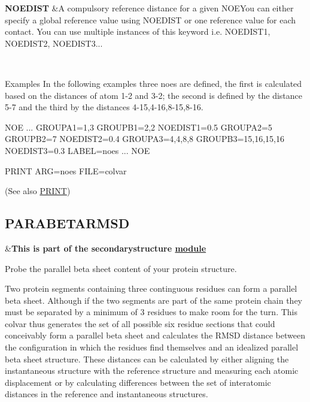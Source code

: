 \begin{TabularC}{2}
\hline
{\bfseries  N\+O\+E\+D\+I\+S\+T } &A compulsory reference distance for a given N\+O\+E\+You can either specify a global reference value using N\+O\+E\+D\+I\+S\+T or one reference value for each contact. You can use multiple instances of this keyword i.\+e. N\+O\+E\+D\+I\+S\+T1, N\+O\+E\+D\+I\+S\+T2, N\+O\+E\+D\+I\+S\+T3...  

\\
\end{TabularC}


\begin{DoxyParagraph}{Examples}
In the following examples three noes are defined, the first is calculated based on the distances of atom 1-\/2 and 3-\/2; the second is defined by the distance 5-\/7 and the third by the distances 4-\/15,4-\/16,8-\/15,8-\/16.
\end{DoxyParagraph}
\begin{DoxyVerb}NOE ...
GROUPA1=1,3 GROUPB1=2,2 NOEDIST1=0.5
GROUPA2=5 GROUPB2=7 NOEDIST2=0.4
GROUPA3=4,4,8,8 GROUPB3=15,16,15,16 NOEDIST3=0.3
LABEL=noes
... NOE

PRINT ARG=noes FILE=colvar
\end{DoxyVerb}
 (See also \hyperlink{PRINT}{P\+R\+I\+N\+T}) \hypertarget{PARABETARMSD}{}\subsection{P\+A\+R\+A\+B\+E\+T\+A\+R\+M\+S\+D}\label{PARABETARMSD}
\begin{TabularC}{2}
\hline
&{\bfseries  This is part of the secondarystructure \hyperlink{mymodules}{module }}   \\
\end{TabularC}
Probe the parallel beta sheet content of your protein structure.

Two protein segments containing three continguous residues can form a parallel beta sheet. Although if the two segments are part of the same protein chain they must be separated by a minimum of 3 residues to make room for the turn. This colvar thus generates the set of all possible six residue sections that could conceivably form a parallel beta sheet and calculates the R\+M\+S\+D distance between the configuration in which the residues find themselves and an idealized parallel beta sheet structure. These distances can be calculated by either aligning the instantaneous structure with the reference structure and measuring each atomic displacement or by calculating differences between the set of interatomic distances in the reference and instantaneous structures.

